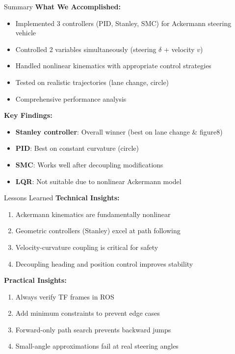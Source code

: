 \documentclass[10pt]{beamer}
\begin{document}
\begin{frame}{Summary}
  \textbf{What We Accomplished:}
  \begin{itemize}
    \item Implemented 3 controllers (PID, Stanley, SMC) for Ackermann steering vehicle
    \item Controlled 2 variables simultaneously (steering $\delta$ + velocity $v$)
    \item Handled nonlinear kinematics with appropriate control strategies
    \item Tested on realistic trajectories (lane change, circle)
    \item Comprehensive performance analysis
  \end{itemize}

  \vspace{0.5cm}

  \textbf{Key Findings:}
  \begin{itemize}
    \item \textbf{Stanley controller}: Overall winner (best on lane change \& figure8)
    \item \textbf{PID}: Best on constant curvature (circle)
    \item \textbf{SMC}: Works well after decoupling modifications
    \item \textbf{LQR}: Not suitable due to nonlinear Ackermann model
  \end{itemize}
\end{frame}

\begin{frame}{Lessons Learned}
  \textbf{Technical Insights:}
  \begin{enumerate}
    \item Ackermann kinematics are fundamentally nonlinear
    \item Geometric controllers (Stanley) excel at path following
    \item Velocity-curvature coupling is critical for safety
    \item Decoupling heading and position control improves stability
  \end{enumerate}

  \vspace{0.5cm}

  \textbf{Practical Insights:}
  \begin{enumerate}
    \item Always verify TF frames in ROS
    \item Add minimum constraints to prevent edge cases
    \item Forward-only path search prevents backward jumps
    \item Small-angle approximations fail at real steering angles
  \end{enumerate}
\end{frame}
\end{document}

